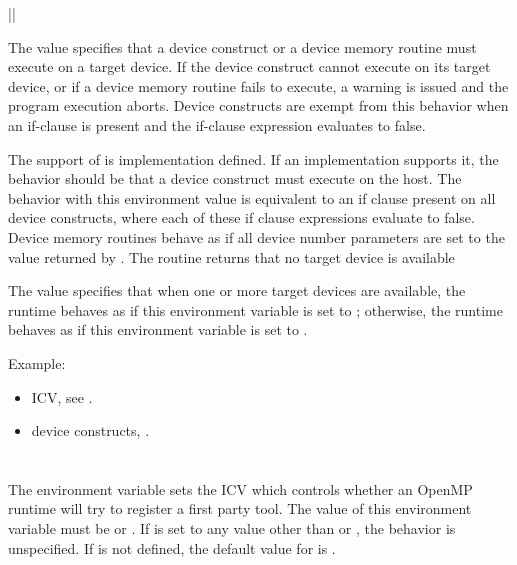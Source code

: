 {||}

The  value specifies that a device construct or a device memory routine must execute on a target device. If the device construct cannot execute on its target device, or if a device memory routine fails to execute, a warning is issued and the program execution aborts. Device constructs are exempt from this behavior when an if-clause is present and the if-clause expression evaluates to false.

The support of   is implementation defined. If an implementation supports it, the behavior should be that a device construct must execute on the host.  The behavior with this environment value is equivalent to an if clause present on all device constructs, where each of these if clause expressions evaluate to false. Device memory routines behave as if all device number parameters are set to the value returned by . The  routine returns that no target device is available

The  value specifies that when one or more target devices are available, the runtime behaves as if this environment variable is set to ; otherwise, the runtime behaves as if this environment variable is set to .

Example:
\begin{ompEnv}
\end{ompEnv}

\crossreferences
\begin{itemize}
\item {} ICV, see .
\item device constructs, .
\end{itemize}




\section{}
\label{sec:OMP_TOOL}

The  environment variable sets the  ICV which controls whether an OpenMP runtime will try to register a
first party tool.
The value of this environment variable must be  or .
If  is set to any value other than  or , the behavior is unspecified.
If  is not defined, the default value for  is .

